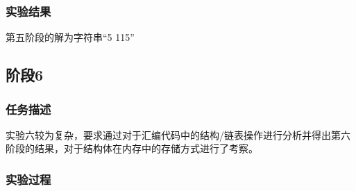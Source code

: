 \subsubsection{实验结果}
第五阶段的解为字符串``5 115''

\subsection{阶段6}
\subsubsection{任务描述}
实验六较为复杂，要求通过对于汇编代码中的结构/链表操作进行分析并得出第六阶段的结果，对于结构体在内存中的存储方式进行了考察。

\subsubsection{实验过程}
